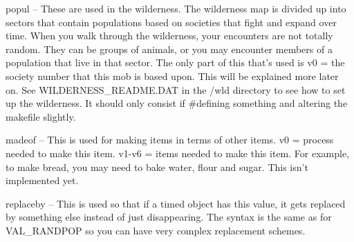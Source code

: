 \bul popul -- These are used in the wilderness. The wilderness map is
divided up into sectors that contain populations based on societies
that fight and expand over time. When you walk through the
wilderness, your encounters are not totally random. They can be groups
of animals, or you may encounter members of a population that live
in that sector. The only part of this that's used is v0 = the society
number that this mob is based upon. This will be explained more later on.
See WILDERNESS\_README.DAT in the /wld directory to see how to set up
the wilderness. It should only consist if $\#$defining something and
altering the makefile slightly.

\bul madeof -- This is used for making items in terms of other items.
v0 = process needed to make this item. v1-v6 = items needed to make this
item. For example, to make bread, you may need to bake water, flour and
sugar. This isn't implemented yet.

\bul replaceby -- This is used so that if a timed object has this
value, it gets replaced by something else instead of just disappearing.
The syntax is the same as for VAL\_RANDPOP so you can have very complex
replacement schemes.








